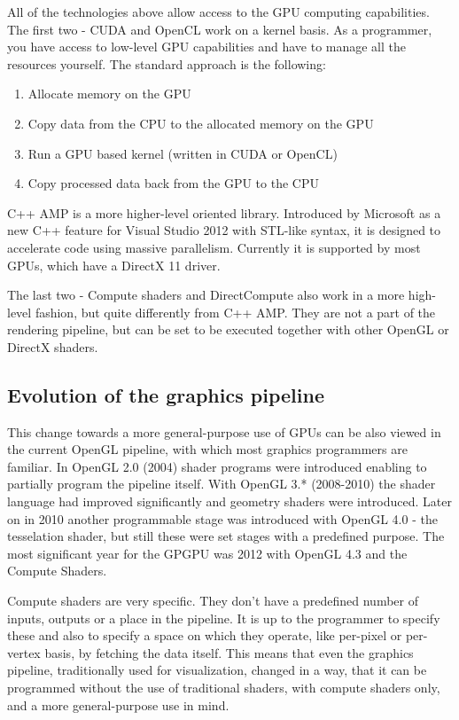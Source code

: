 All of the technologies above allow access to the GPU computing capabilities. The first two - CUDA and OpenCL work on a kernel basis. As a programmer, you have access to low-level GPU capabilities and have to manage all the resources yourself. The standard approach is the following:

\begin{enumerate}
	\item Allocate memory on the GPU
	\item Copy data from the CPU to the allocated memory on the GPU
	\item Run a GPU based kernel (written in CUDA or OpenCL)
	\item Copy processed data back from the GPU to the CPU
\end{enumerate}

C++ AMP is a more higher-level oriented library. Introduced by Microsoft as a new C++ feature for Visual Studio 2012 with STL-like syntax, it is designed to accelerate code using massive parallelism. Currently it is supported by most GPUs, which have a DirectX 11 driver.

The last two - Compute shaders and DirectCompute also work in a more high-level fashion, but quite differently from C++ AMP. They are not a part of the rendering pipeline, but can be set to be executed together with other OpenGL or DirectX shaders.

\subsection{Evolution of the graphics pipeline}

This change towards a more general-purpose use of GPUs can be also viewed in the current OpenGL pipeline, with which most graphics programmers are familiar. In OpenGL 2.0 (2004) shader programs were introduced enabling to partially program the pipeline itself. With OpenGL 3.* (2008-2010) the shader language had improved significantly and geometry shaders were introduced. Later on in 2010 another programmable stage was introduced with OpenGL 4.0 - the tesselation shader, but still these were set stages with a predefined purpose. The most significant year for the GPGPU was 2012 with OpenGL 4.3 and the Compute Shaders. 

Compute shaders are very specific. They don't have a predefined number of inputs, outputs or a place in the pipeline. It is up to the programmer to specify these and also to specify a space on which they operate, like per-pixel or per-vertex basis, by fetching the data itself. This means that even the graphics pipeline, traditionally used for visualization, changed in a way, that it can be programmed without the use of traditional shaders, with compute shaders only, and a more general-purpose use in mind.

